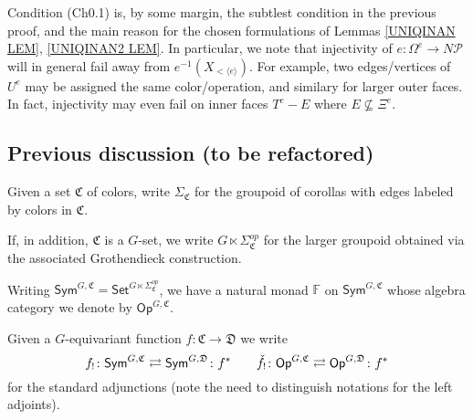 \documentclass[a4paper,10pt
,draft
]{article}%
\renewcommand{\1}{\eta}%
\begin{document}
\begin{remark}
	Condition (Ch0.1) is, by some margin, the subtlest condition in the previous proof, and the main reason for the chosen formulations of 
	Lemmas \ref{UNIQINAN LEM}, \ref{UNIQINAN2 LEM}.
	In particular, we note that injectivity of 
	$e \colon \Omega^e \to N \mathcal{P}$ will in general fail away from 
	$e^{-1}(X_{< \langle e \rangle})$.
	For example, two edges/vertices of $U^e$
	may be assigned the same color/operation, and similary for larger outer faces. In fact, injectivity may even fail on inner faces
	$T^e-E$ where $E \not \subseteq \Xi^e$.
\end{remark}




\subsection{Previous discussion (to be refactored)}


Given a set $\mathfrak{C}$ of colors,
write $\Sigma_{\mathfrak{C}}$ for the groupoid of corollas with edges labeled by colors in $\mathfrak{C}$.

If, in addition, $\mathfrak{C}$ is a $G$-set, 
we write $G \ltimes \Sigma_{\mathfrak{C}}^{op}$ for the larger groupoid obtained via the associated Grothendieck construction.



Writing
$\mathsf{Sym}^{G,\mathfrak{C}} = 
\mathsf{Set}^{G \ltimes \Sigma_{\mathfrak{C}}^{op}}$,
we have a natural monad $\mathbb{F}$ on
$\mathsf{Sym}^{G,\mathfrak{C}}$
whose algebra category we denote by 
$\mathsf{Op}^{G,\mathfrak{C}}$.


\begin{notation}
	Given a $G$-equivariant function 
	$f \colon \mathfrak{C} \to \mathfrak{D}$
	we write
\[
	f_{!} \colon 
	\mathsf{Sym}^{G,\mathfrak{C}}
	\rightleftarrows
	\mathsf{Sym}^{G,\mathfrak{D}}
	\colon f^{\**}
\qquad
	\check{f}_{!} \colon 
	\mathsf{Op}^{G,\mathfrak{C}}
	\rightleftarrows
	\mathsf{Op}^{G,\mathfrak{D}}
	\colon f^{\**}
\]
for the standard adjunctions (note the need to distinguish notations for the left adjoints).
\end{notation}
\end{document}
